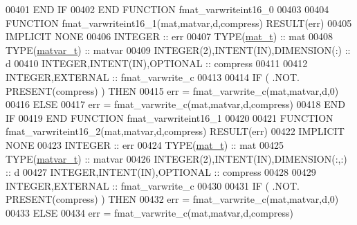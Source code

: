 \begin{DoxyCode}
00401 \textcolor{keywordflow}{    END IF}
00402 \textcolor{keyword}{END FUNCTION }fmat\_varwriteint16\_0
00403 
00404 \textcolor{keyword}{FUNCTION }fmat\_varwriteint16\_1(mat,matvar,d,compress) \textcolor{keyword}{RESULT}(err)
00405 \textcolor{keywordtype}{IMPLICIT NONE}
00406     \textcolor{keywordtype}{INTEGER}                                  :: err
00407     \textcolor{keywordtype}{TYPE}(\hyperlink{group___m_a_t_gab0fc888f5a5d79943b16284b1f91c2e8}{mat\_t})                              :: mat
00408     \textcolor{keywordtype}{TYPE}(\hyperlink{group___m_a_t_structmatvar__t}{matvar\_t})                           :: matvar
00409     \textcolor{keywordtype}{INTEGER(2)},\textcolor{keywordtype}{INTENT(IN)},\textcolor{keywordtype}{DIMENSION(:)}       :: d
00410     \textcolor{keywordtype}{INTEGER},\textcolor{keywordtype}{INTENT(IN)},\textcolor{keywordtype}{OPTIONAL}              :: compress
00411 
00412     \textcolor{keywordtype}{INTEGER},\textcolor{keywordtype}{EXTERNAL}                         :: fmat\_varwrite\_c
00413 
00414     \textcolor{keywordflow}{IF} ( .NOT. \textcolor{keyword}{PRESENT}(compress) ) \textcolor{keywordflow}{THEN}
00415         err = fmat\_varwrite\_c(mat,matvar,d,0)
00416     \textcolor{keywordflow}{ELSE}
00417         err = fmat\_varwrite\_c(mat,matvar,d,compress)
00418 \textcolor{keywordflow}{    END IF}
00419 \textcolor{keyword}{END FUNCTION }fmat\_varwriteint16\_1
00420 
00421 \textcolor{keyword}{FUNCTION }fmat\_varwriteint16\_2(mat,matvar,d,compress) \textcolor{keyword}{RESULT}(err)
00422 \textcolor{keywordtype}{IMPLICIT NONE}
00423     \textcolor{keywordtype}{INTEGER}                                  :: err
00424     \textcolor{keywordtype}{TYPE}(\hyperlink{group___m_a_t_gab0fc888f5a5d79943b16284b1f91c2e8}{mat\_t})                              :: mat
00425     \textcolor{keywordtype}{TYPE}(\hyperlink{group___m_a_t_structmatvar__t}{matvar\_t})                           :: matvar
00426     \textcolor{keywordtype}{INTEGER(2)},\textcolor{keywordtype}{INTENT(IN)},\textcolor{keywordtype}{DIMENSION(:,:)}     :: d
00427     \textcolor{keywordtype}{INTEGER},\textcolor{keywordtype}{INTENT(IN)},\textcolor{keywordtype}{OPTIONAL}              :: compress
00428 
00429     \textcolor{keywordtype}{INTEGER},\textcolor{keywordtype}{EXTERNAL}                         :: fmat\_varwrite\_c
00430 
00431     \textcolor{keywordflow}{IF} ( .NOT. \textcolor{keyword}{PRESENT}(compress) ) \textcolor{keywordflow}{THEN}
00432         err = fmat\_varwrite\_c(mat,matvar,d,0)
00433     \textcolor{keywordflow}{ELSE}
00434         err = fmat\_varwrite\_c(mat,matvar,d,compress)

\end{DoxyCode}
